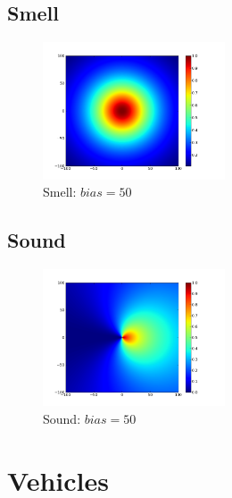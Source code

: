 \documentclass[a4paper]{article}
\begin{document}
\subsection{Smell}
\begin{figure}
	\vspace{-30pt}
	\begin{center}
		\includegraphics[width=0.48\textwidth]{graphs/smell.png}
	\end{center}
	\vspace{-30pt}
	\caption{Smell: $bias=50$}
\end{figure}

\subsection{Sound}
\begin{figure}
	\vspace{-30pt}
	\begin{center}
		\includegraphics[width=0.48\textwidth]{graphs/cardioid.png}
	\end{center}
	\vspace{-30pt}
	\caption{Sound: $bias=50$}
\end{figure}


\cleardoublepage
\section{Vehicles}
\end{document}
